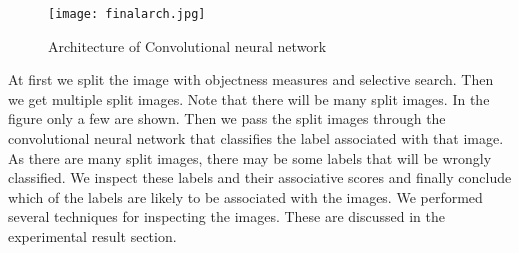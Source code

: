 \begin{figure}[h!]
  \centering
  \texttt{[image: finalarch.jpg]}
  \caption{Architecture of Convolutional neural network}\label{finalarch}
\end{figure}

At first we split the image with objectness measures and selective search. Then we get multiple split images. Note that there will be many split images. In the figure only a few are shown. Then we pass the split images through the convolutional neural network that classifies the label associated with that image. As there are many split images, there may be some labels that will be wrongly classified. We inspect these labels and their associative scores and finally conclude which of the labels are likely to be associated with the images. We performed several techniques for inspecting the images. These are discussed in the experimental result section.

